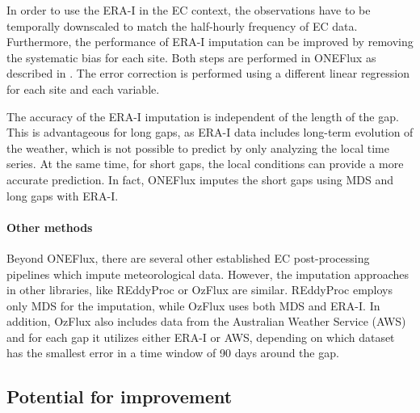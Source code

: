 \documentclass{article}
\let\Oldsubsection\subsection
\renewcommand{\subsection}{\FloatBarrier\Oldsubsection}
\begin{document}
In order to use the ERA-I in the EC context, the observations have to be temporally downscaled to match the half-hourly frequency of EC data. Furthermore, the performance of ERA-I imputation can be improved by removing the systematic bias for each site. Both steps are performed in \textsf{ONEFlux} as described in \cite{vuichard_filling_2015}. The error correction is performed using a different linear regression for each site and each variable.

The accuracy of the ERA-I imputation is independent of the length of the gap. This is advantageous for long gaps, as ERA-I data includes long-term evolution of the weather, which is not possible to predict by only analyzing the local time series. At the same time, for short gaps, the local conditions can provide a more  accurate prediction.
In fact, \textsf{ONEFlux} imputes the short gaps using MDS and long gaps with ERA-I.

\paragraph{Other methods} Beyond \textsf{ONEFlux}, there are several other established EC post-processing pipelines which impute meteorological data. However, the imputation approaches in other libraries, like \textsf{REddyProc} \cite{wutzler_basic_2018} or \textsf{OzFlux} \cite{isaac_ozflux_2017} are similar. \textsf{REddyProc} employs only MDS for the imputation, while \textsf{OzFlux} uses both MDS and ERA-I. In addition, \textsf{OzFlux} also includes data from the Australian Weather Service (AWS) and for each gap it utilizes either ERA-I or AWS, depending on which dataset has the smallest error in a time window of 90 days around the gap.

\subsection{Potential for improvement}
\end{document}
